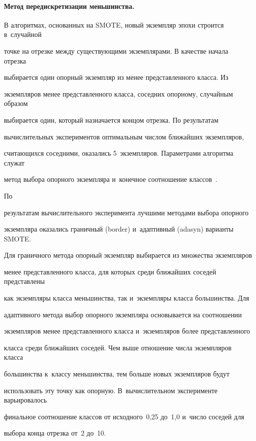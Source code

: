 \paragraph*{Метод передискретизации меньшинства.}

В алгоритмах, основанных на SMOTE, новый экземпляр эпохи строится в~случайной 

точке на отрезке между существующими экземплярами. В качестве начала отрезка 

выбирается один опорный экземпляр из менее представленного класса. Из 

экземпляров менее представленного класса, соседних опорному, случайным образом 

выбирается один, который назначается концом отрезка. По результатам 

вычислительных экспериментов оптимальным числом ближайших экземпляров, 

считающихся соседними, оказались 5~экземпляров. Параметрами алгоритма служат 

метод выбора опорного экземпляра и~конечное соотношение классов~\cite{smote}. 



По 

результатам вычислительного эксперимента лучшими методами выбора опорного 

экземпляра оказались граничный (border) и~адаптивный (adasyn) варианты SMOTE. 

Для граничного метода опорный экземпляр выбирается из множества экземпляров 

менее представленного класса, для которых среди ближайших соседей представлены 

как экземпляры класса меньшинства, так и~экземпляры класса большинства. Для 

адаптивного метода выбор опорного экземпляра основывается на соотношении 

экземпляров менее представленного класса и~экземпляров более представленного 

класса среди ближайших соседей. Чем выше отношение числа экземпляров класса 

большинства к~классу меньшинства, тем больше новых экземпляров будут 

использовать эту точку как опорную. В~вычислительном эксперименте варьировалось 

финальное соотношение классов от исходного~0,25 до~1,0 и~число соседей для 

выбора конца отрезка от~2 до~10.







